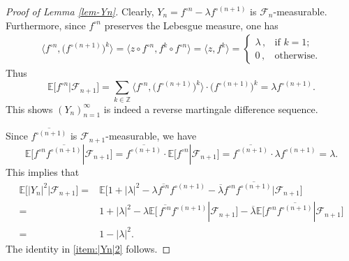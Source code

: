\documentclass[11pt, reqno]{amsart}
\theoremstyle{definition}
\newtheorem*{Brown-Eagleson Theorem}{The Brown-Eagleson Theorem}
\newcommand{\F}{\mathscr F}
\newcommand{\E}{\mathbb E}
\newcommand{\ol}{\overline}
\newcommand{\la}{\langle}
\newcommand{\ra}{\rangle}
\begin{document}
	\begin{proof}[Proof of Lemma \ref{lem-Yn}] Clearly, $Y_n=f^{\circ n} - \lambda f^{\circ (n+1)}$ is $\F_{n}$-measurable. Furthermore, since $f^{\circ n}$ preserves the Lebesgue measure, one has
			\begin{align}
				\big\la f^{\circ n}, \big(f^{\circ (n+1)}\big)^k \big\ra = \big\la z \circ f^{\circ n}, f^k \circ f^{\circ n}\big\ra= \big\la z, f^k\big\ra =
				\begin{cases}
					\lambda\,, &  \text{if }k=1; \\ 
					 0\,, &  \text{otherwise}.
				\end{cases}
		\end{align}
		Thus $$\E\big[ f^{\circ n} | \F_{n+1}\big] = \sum_{k\in \mathbb Z} \big\la f^{\circ n}, \big(f^{\circ (n+1)}\big)^k \big\ra \cdot \big(f^{\circ (n+1)}\big)^k = \lambda f^{\circ (n+1)}.$$ This shows $(Y_n)_{n=1}^\infty$ is indeed a reverse martingale difference sequence. 

		Since $\overline{f^{\circ (n+1)}}$ is $\mathscr{F}_{n+1}$-measurable, we have $$\E\big[ f^{\circ n} \ol{f^{\circ (n+1)}} | \F_{n+1}\big] = \ol{f^{\circ (n+1)}} \cdot \E\big[ f^{\circ n} | \F_{n+1}\big] = \ol{f^{\circ (n+1)}}\cdot \lambda f^{\circ (n+1)} = \lambda.$$ This implies that 
		\begin{align*} 
			\E\big[|Y_n|^2 | \F_{n+1}\big] =& \E\big[ 1+ |\lambda|^2 - \lambda \ol{f^{\circ n}} f^{\circ (n+1)} - \ol{\lambda} f^{\circ n} \ol{f^{\circ (n+1)}} | \F_{n+1}\big]\\
			=&1+ |\lambda|^2  - \lambda \E\big[ \,\ol{f^{\circ n}} f^{\circ (n+1)}|\F_{n+1}\big] - \ol{\lambda} \E\big[f^{\circ n} \ol{f^{\circ (n+1)}} | \F_{n+1}\big]\\
			=& 1-|\lambda|^2.
		\end{align*}
		The identity in \ref{item:|Yn|2} follows.


\end{proof}
\end{document}
